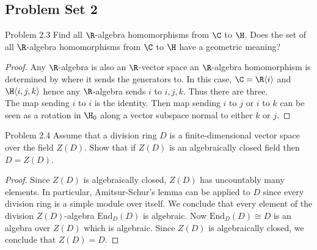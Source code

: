 \documentclass[a4paper]{article}
\begin{document}
\subsection{Problem Set 2}
\begin{ex}{Problem 2.3}{} Find all $\R$-algebra homomorphisms from $\C$ to $\H$. Does the set of all $\R$-algebra homomorphisms from $\C$ to $\H$ have a geometric meaning? 
\begin{proof}
Any $\R$-algebra is also an $\R$-vector space an $\R$-algebra homomorphism is determined by where it sends the generators to. In this case, $\C=\R\langle i\rangle$ and $\H\langle i,j,k\rangle$ hence any $\R$-algebra sends $i$ to $i,j,k$. Thus there are three. \\

The map sending $i$ to $i$ is the identity. Then map sending $i$ to $j$ or $i$ to $k$ can be seen as a rotation in $\H_0$ along a vector subspace normal to either $k$ or $j$. 
\end{proof}
\end{ex}

\begin{ex}{Problem 2.4}{} Assume that a division ring $D$ is a finite-dimensional vector space over the field $Z(D)$. Show that if $Z(D)$ is an algebraically closed field then $D=Z(D)$. 
\begin{proof}
Since $Z(D)$ is algebraically closed, $Z(D)$ has uncountably many elements. In particular, Amitsur-Schur's lemma can be applied to $D$ since every division ring is a simple module over itself. We conclude that every element of the division $Z(D)$-algebra $\text{End}_D(D)$ is algebraic. Now $\text{End}_D(D)\cong D$ is an algebra over $Z(D)$ which is algebraic. Since $Z(D)$ is algebraically closed, we conclude that $Z(D)=D$. 
\end{proof}
\end{ex}
\end{document}
